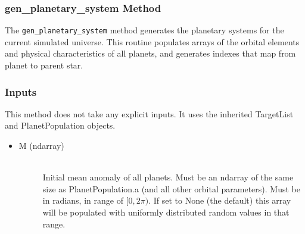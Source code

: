 \documentclass[cleanfoot]{asme2ej}
\begin{document}
\subsubsection{gen\_planetary\_system Method} \label{sec:genplanetarysystemstask}
The \verb+gen_planetary_system+ method generates the planetary systems for the current simulated universe. This routine populates arrays of the orbital elements and physical characteristics of all planets, and generates indexes that map from planet to parent star.

\subsubsection*{Inputs}
This method does not take any explicit inputs.  It uses the inherited TargetList and PlanetPopulation objects.
\begin{itemize}
    \item 
    \begin{description}
        \item[M (ndarray)] \hfill \\
        Initial mean anomaly of all planets.  Must be an ndarray of the same size as PlanetPopulation.a (and all other orbital parameters).  Must be in radians, in range of $[0,2\pi)$. If set to None (the default) this array will be populated with uniformly distributed random values in that range.
  \end{description}
\end{itemize}
\end{document}
